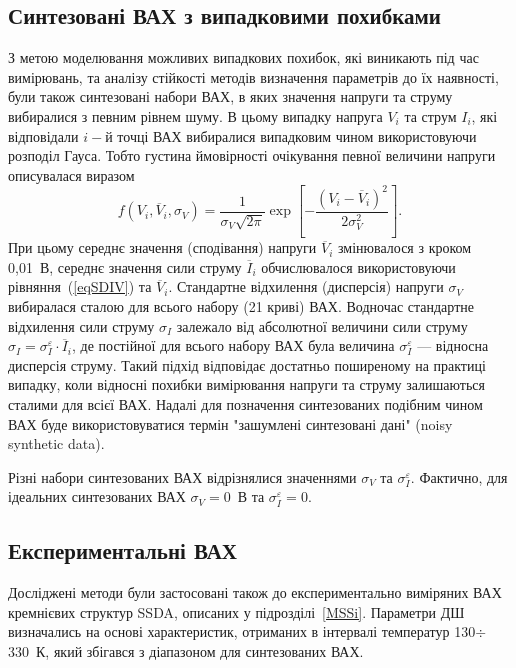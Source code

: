 \subsection{Синтезовані ВАХ з випадковими похибками}
З метою моделювання можливих випадкових похибок, які виникають під час вимірювань, та аналізу стійкості методів визначення параметрів до їх наявності,
були також синтезовані набори ВАХ, в яких значення напруги та струму вибиралися з певним рівнем шуму.
В цьому випадку напруга $V_i$ та струм $I_i$, які відповідали $i-$й точці ВАХ вибиралися випадковим чином використовуючи розподіл Гауса.
Тобто густина ймовірності очікування певної величини напруги описувалася виразом
\begin{equation}
\label{eqGaus}
f(V_i,\overline{V}_i,\sigma_V)=\frac{1}{\sigma_V\sqrt{2\pi}}\exp\left[-\frac{(V_i-\overline{V}_i)^2}{2\sigma_V^2}\right].
\end{equation}
При цьому середнє значення (сподівання) напруги $\overline{V}_i$ змінювалося з кроком 0,01~В,
середнє значення сили струму $\overline{I}_i$ обчислювалося використовуючи рівняння~(\ref{eqSDIV}) та $\overline{V}_i$.
Стандартне відхилення (дисперсія) напруги $\sigma_V$ вибиралася сталою для всього набору (21 криві) ВАХ.
Водночас стандартне відхилення сили струму $\sigma_I$ залежало від абсолютної величини сили струму $\sigma_I=\sigma_I^\varepsilon\cdot\overline{I}_i$,
де постійної для всього набору ВАХ була величина $\sigma_I^\varepsilon$ --- відносна дисперсія струму.
Такий підхід відповідає достатньо поширеному на практиці випадку, коли відносні похибки вимірювання напруги та струму залишаються сталими для всієї ВАХ.
Надалі для позначення синтезованих подібним чином ВАХ буде використовуватися термін "зашумлені синтезовані дані" (noisy synthetic data).

Різні набори синтезованих ВАХ відрізнялися значеннями $\sigma_V$ та $\sigma_I^\varepsilon$.
Фактично, для ідеальних синтезованих ВАХ $\sigma_V=0$~В та $\sigma_I^\varepsilon=0$.


\subsection{Експериментальні ВАХ}
Досліджені методи були застосовані також до експериментально виміряних ВАХ кремнієвих структур SSDA, описаних у підрозділі~\ref{MSSi}.
Параметри ДШ визначались на основі характеристик, отриманих в інтервалі температур 130$\div$330~К, який збігався з діапазоном для синтезованих ВАХ.

